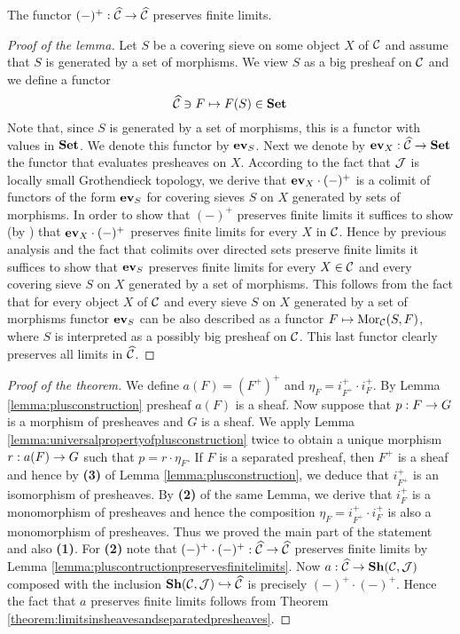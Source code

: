 \begin{lemma}\label{lemma:pluscontructionpreservesfinitelimits}
The functor $(-)^+:\widehat{{\mathcal C}}\rightarrow \widehat{{\mathcal C}}$ preserves finite limits. 
\end{lemma}
\begin{proof}[Proof of the lemma]
Let $S$ be a covering sieve on some object $X$ of ${\mathcal C}$ and assume that $S$ is generated by a set of morphisms. We view $S$ as a big presheaf on ${\mathcal C}$ and we define a functor
$$\widehat{{\mathcal C}}\ni F\mapsto F(S)\in \mathbf{Set}$$
Note that, since $S$ is generated by a set of morphisms, this is a functor with values in $\mathbf{Set}$. We denote this functor by $\mathbf{ev}_S$. Next we denote by $\mathbf{ev}_X:\widehat{{\mathcal C}}\rightarrow \mathbf{Set}$ the functor that evaluates presheaves on $X$. According to the fact that ${\mathcal J}$ is locally small Grothendieck topology, we derive that $\mathbf{ev}_X\cdot (-)^+$ is a colimit of functors of the form $\mathbf{ev}_S$ for covering sieves $S$ on $X$ generated by sets of morphisms. In order to show that $(-)^+$ preserves finite limits it suffices to show (by {\cite[Corollary 3.5]{Presheaves}}) that $\mathbf{ev}_X\cdot (-)^+$ preserves finite limits for every $X$ in ${\mathcal C}$. Hence by previous analysis and the fact that colimits over directed sets preserve finite limits {\cite[page 215, Theorem 1]{Maclane}} it suffices to show that $\mathbf{ev}_S$ preserves finite limits for every $X\in {\mathcal C}$ and every covering sieve $S$ on $X$ generated by a set of morphisms. This follows from the fact that for every object $X$ of ${\mathcal C}$ and every sieve $S$ on $X$ generated by a set of morphisms functor $\mathbf{ev}_S$ can be also described as a functor $F\mapsto \mathrm{Mor}_{{\mathcal C}}(S,F)$, where $S$ is interpreted as a possibly big presheaf on ${\mathcal C}$. This last functor clearly preserves all limits in $\widehat{{\mathcal C}}$. 
\end{proof}

\begin{proof}[Proof of the theorem]
We define $a(F)=\left(F^+\right)^+$ and $\eta_F=i^+_{F^+}\cdot i^+_F$. By Lemma \ref{lemma:plusconstruction} presheaf $a(F)$ is a sheaf. Now suppose that $p:F\rightarrow G$ is a morphism of presheaves and $G$ is a sheaf. We apply Lemma \ref{lemma:universalpropertyofplusconstruction} twice to obtain a unique morphism $r:a(F)\rightarrow G$ such that $p=r\cdot \eta_F$. If $F$ is a separated presheaf, then $F^+$ is a sheaf and hence by \textbf{(3)} of Lemma \ref{lemma:plusconstruction}, we deduce that $i^+_{F^+}$ is an isomorphism of presheaves. By \textbf{(2)} of the same Lemma, we derive that $i^+_F$ is a monomorphism of presheaves and hence the composition $\eta_F = i^+_{F^+}\cdot i^+_F$ is also a monomorphism of presheaves. Thus we proved the main part of the statement and also \textbf{(1)}. For \textbf{(2)} note that  $(-)^+\cdot (-)^+:\widehat{{\mathcal C}}\rightarrow \widehat{{\mathcal C}}$ preserves finite limits by Lemma \ref{lemma:pluscontructionpreservesfinitelimits}. Now $a:\widehat{{\mathcal C}}\rightarrow \mathbf{Sh}({\mathcal C},{\mathcal J})$ composed with the inclusion $\mathbf{Sh}({\mathcal C},{\mathcal J})\hookrightarrow \widehat{{\mathcal C}}$ is precisely $(-)^+\cdot (-)^+$. Hence the fact that $a$ preserves finite limits follows from Theorem \ref{theorem:limitsinsheavesandseparatedpresheaves}.
\end{proof}

